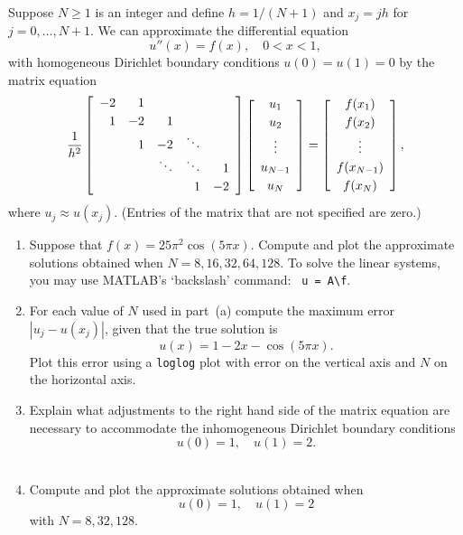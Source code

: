 
Suppose $N\ge 1$ is an integer and define $h = 1/(N+1)$ and $x_j = jh$ for $j=0,\ldots, N+1$. We can approximate the differential equation
\[
u''(x) = f(x), \quad 0<x<1,
\]
with homogeneous Dirichlet boundary conditions $u(0)=u(1) = 0$ by the matrix equation
\[
{1\over h^2} \left[\begin{array}{rrrrr}
              -2 & 1 \\[0.25em]
               1 & -2 & 1 \\
                 &  1  & -2 & \ddots \\
                 & & \ddots & \ddots & 1 \\[0.25em]
                 & & & 1 & -2 
               \end{array}\right]
          \left[\begin{array}{c} u_1 \\[0.25em] u_2 \\[0.25em] \vdots \\[0.25em] u_{N-1} \\[0.25em] u_N \end{array}\right]
 =   \left[\begin{array}{c} f(x_1) \\[0.25em] f(x_2) \\[0.25em] \vdots \\[0.25em] f(x_{N-1}) \\[0.25em] f(x_N) \end{array}\right],
\]
where $u_j \approx u(x_j)$.  (Entries of the matrix that are not specified are zero.)
\\
\begin{enumerate}
\item Suppose that $f(x) = 25 \pi^2 \cos (5\pi x)$. Compute and plot the approximate solutions obtained when $N=8, 16, 32, 64, 128$. To solve the linear systems, you may use MATLAB's `backslash' command: \verb| u = A\f|.
\\
\item For each value of $N$ used in part~(a) compute the maximum error $|u_j - u(x_j)|$, given that the true solution is
\[
u(x) = 1-2x-\cos(5\pi x).
\]
Plot this error using a \verb|loglog| plot with error on the vertical axis and $N$ on the horizontal axis.
\\
\item Explain what adjustments to the right hand side of the matrix equation are necessary to accommodate the inhomogeneous Dirichlet boundary conditions
\[
u(0)=1,\quad  u(1)=2.
\]
\\
\item Compute and plot the approximate solutions obtained when
\[
u(0)=1,\quad  u(1)=2
\]
with $N=8, 32, 128$.
\end{enumerate} 



